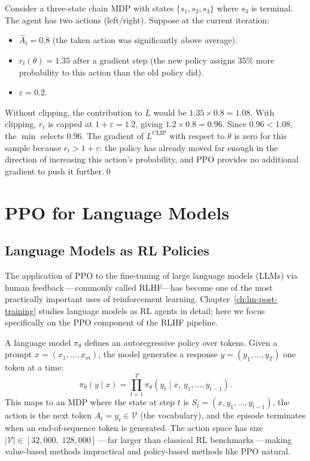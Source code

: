 \begin{example}
\label{ex:ppo-numeric}
Consider a three-state chain MDP with states $\{s_1, s_2, s_3\}$ where
$s_3$ is terminal.  The agent has two actions (left/right).  Suppose at
the current iteration:
\begin{itemize}[leftmargin=*]
  \item $\hat{A}_t = 0.8$ (the taken action was significantly above average).
  \item $r_t(\theta) = 1.35$ after a gradient step (the new policy assigns
    $35\%$ more probability to this action than the old policy did).
  \item $\varepsilon = 0.2$.
\end{itemize}
Without clipping, the contribution to $L$ would be $1.35 \times 0.8 = 1.08$.
With clipping, $r_t$ is capped at $1+\varepsilon = 1.2$, giving
$1.2 \times 0.8 = 0.96$.  Since $0.96 < 1.08$, the $\min$ selects $0.96$.
The gradient of $L^{\mathrm{CLIP}}$ with respect to $\theta$ is zero for this
sample because $r_t > 1+\varepsilon$: the policy has already moved far enough
in the direction of increasing this action's probability, and PPO provides
no additional gradient to push it further.\qed
\end{example}

\section{PPO for Language Models}
\label{sec:ppo-llm}

\subsection{Language Models as RL Policies}

The application of PPO to the fine-tuning of large language models (LLMs)
via human feedback\,---\,commonly called
RLHF---has
become one of the most practically important uses of reinforcement learning.
Chapter~\ref{ch:lm-post-training} studies language models as RL agents in detail;
here we focus specifically on the PPO component of the RLHF pipeline.

A language model $\pi_\theta$ defines an autoregressive policy over tokens.
Given a prompt $x = (x_1, \ldots, x_m)$, the model generates a response
$y = (y_1, \ldots, y_T)$ one token at a time:
\begin{equation}
\label{eq:lm-policy}
\pi_\theta(y \mid x)
= \prod_{t=1}^T \pi_\theta(y_t \mid x,\, y_1, \ldots, y_{t-1}).
\end{equation}
This maps to an MDP where the state at step $t$ is
$S_t = (x, y_1, \ldots, y_{t-1})$, the action is the next token
$A_t = y_t \in \mathcal{V}$ (the vocabulary), and the episode terminates
when an end-of-sequence token is generated.  The action space has size
$|\mathcal{V}| \in [32{,}000,\; 128{,}000]$\,---\,far larger than classical
RL benchmarks\,---\,making value-based methods impractical and policy-based
methods like PPO natural.

